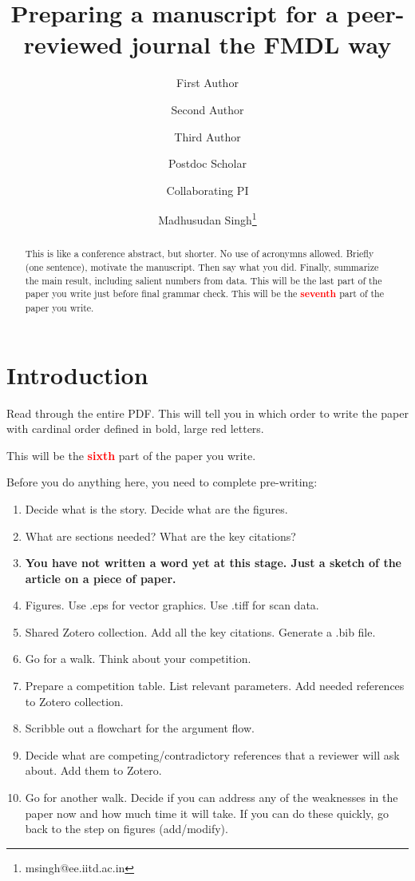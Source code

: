 \documentclass[12 pt]{article}
\title{Preparing a manuscript for a peer-reviewed journal the FMDL way}
\author[1]{\small First Author} %
\author[2]{\small Second Author}  %
\author[1]{\small Third Author}  %
\author[1]{\small Postdoc Scholar}  %
\author[2]{\small Collaborating PI}  %
\author[1]{\small Madhusudan Singh\thanks{msingh@ee.iitd.ac.in}}  %
\affil[1]{\footnotesize Functional Materials \& Devices Laboratory, Department of Electrical Engineering, IIT Delhi, New Delhi, NCT, India, 110 016.} %
\affil[2]{\footnotesize Department of Chemistry, IIT Delhi, New Delhi, NCT, India, 110 016.} %
\date{}
\begin{document}
\maketitle
\begin{abstract}
This is like a conference abstract, but shorter. No use of acronymns allowed. Briefly (one sentence), motivate the manuscript. Then say what you did. Finally, summarize the main result, including salient numbers from data. This will be the last part of the paper you write just before final grammar check. This will be the \textbf{\Huge \textcolor{red}{seventh}} part of the paper you write.
\end{abstract}

\section{Introduction}
\label{sec:introduction}

Read through the entire PDF. This will tell you in which order to write the paper with cardinal order defined in bold, large red letters.

This will be the \textbf{\Huge \textcolor{red}{sixth}} part of the paper you write.

Before you do anything here, you need to complete pre-writing:

\begin{enumerate}
\item Decide what is the story. Decide what are the figures.
\item What are sections needed? What are the key citations?
\item \textbf{You have not written a word yet at this stage. Just a sketch of the article on a piece of paper.}
\item Figures. Use .eps for vector graphics. Use .tiff for scan data.
\item Shared Zotero collection. Add all the key citations. Generate a .bib file.
\item Go for a walk. Think about your competition.
\item Prepare a competition table. List relevant parameters. Add needed references to Zotero collection.
\item Scribble out a flowchart for the argument flow.
\item Decide what are competing/contradictory references that a reviewer will ask about. Add them to Zotero.
\item Go for another walk. Decide if you can address any of the weaknesses in the paper now and how much time it will take. If you can do these quickly, go back to the step on figures (add/modify).
\end{enumerate}
\end{document}
